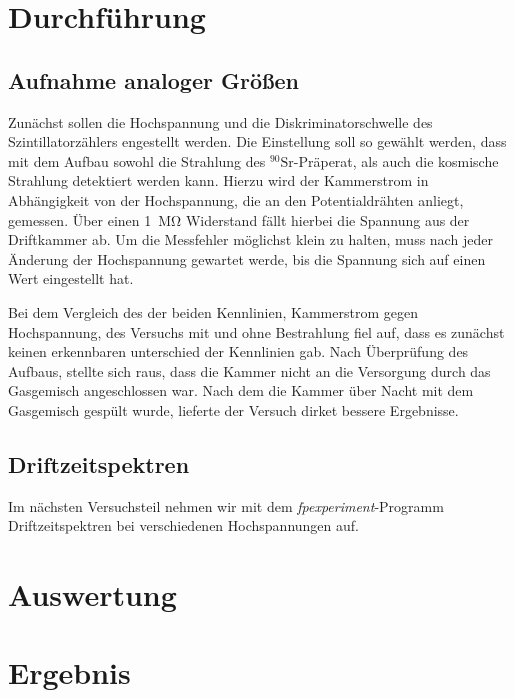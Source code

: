 \documentclass[11pt, ngerman, fleqn, DIV=15, headinclude, BCOR=2cm]{scrreprt}
\begin{document}
\fehlt %

\chapter{Durchführung}

\section{Aufnahme analoger Größen}
Zunächst sollen die Hochspannung und die Diskriminatorschwelle des
Szintillatorzählers engestellt werden.
Die Einstellung soll so gewählt werden, dass mit dem Aufbau sowohl die
Strahlung des $ ^{90}\text{Sr}$-Präperat, als auch die kosmische Strahlung
detektiert werden kann.
Hierzu wird der Kammerstrom  in Abhängigkeit von der Hochspannung, die an den
Potentialdrähten anliegt, gemessen.
Über einen \SI{1}{\mega\ohm} Widerstand fällt hierbei die Spannung aus der Driftkammer
ab.
Um die Messfehler möglichst klein zu halten, muss nach jeder Änderung der
Hochspannung gewartet werde, bis die Spannung sich auf einen Wert eingestellt
hat.

Bei dem Vergleich des der beiden Kennlinien, Kammerstrom gegen Hochspannung,
des Versuchs mit und ohne Bestrahlung fiel auf, dass es zunächst keinen
erkennbaren unterschied der Kennlinien gab.
Nach Überprüfung des Aufbaus, stellte sich raus, dass die Kammer nicht an die
Versorgung durch das Gasgemisch angeschlossen war.
Nach dem die Kammer über Nacht mit dem Gasgemisch gespült wurde, lieferte der
Versuch dirket bessere Ergebnisse.

\section{Driftzeitspektren}
Im nächsten Versuchsteil nehmen wir mit dem \emph{fpexperiment}-Programm
Driftzeitspektren bei verschiedenen Hochspannungen auf.




\chapter{Auswertung}


\chapter{Ergebnis}




\begin{appendix}


\end{appendix}
\end{document}
